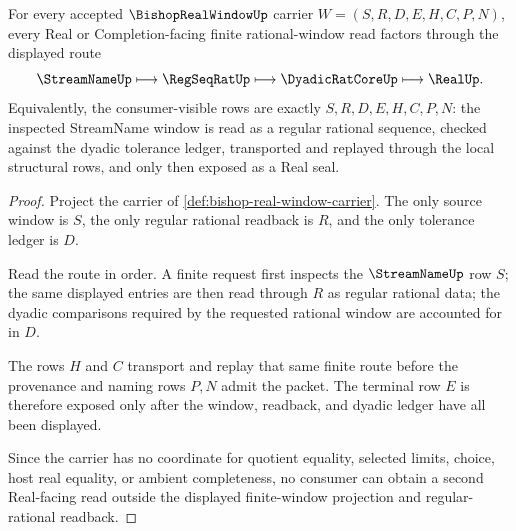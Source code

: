 \begin{theorem}
\label{thm:bishop-real-window-finite-readback}
For every accepted $\BishopRealWindowUp$ carrier $W=(S,R,D,E,H,C,P,N)$, every Real or Completion-facing finite rational-window read factors through the displayed route
$$
\StreamNameUp \longmapsto \RegSeqRatUp \longmapsto \DyadicRatCoreUp \longmapsto \RealUp .
$$
Equivalently, the consumer-visible rows are exactly $S,R,D,E,H,C,P,N$: the inspected StreamName window is read as a regular rational sequence, checked against the dyadic tolerance ledger, transported and replayed through the local structural rows, and only then exposed as a Real seal.
\end{theorem}
\begin{proof}
Project the carrier of \autoref{def:bishop-real-window-carrier}. The only source window is $S$, the only regular rational readback is $R$, and the only tolerance ledger is $D$.

Read the route in order. A finite request first inspects the $\StreamNameUp$ row $S$; the same displayed entries are then read through $R$ as regular rational data; the dyadic comparisons required by the requested rational window are accounted for in $D$.

The rows $H$ and $C$ transport and replay that same finite route before the provenance and naming rows $P,N$ admit the packet. The terminal row $E$ is therefore exposed only after the window, readback, and dyadic ledger have all been displayed.

Since the carrier has no coordinate for quotient equality, selected limits, choice, host real equality, or ambient completeness, no consumer can obtain a second Real-facing read outside the displayed finite-window projection and regular-rational readback.
\end{proof}


